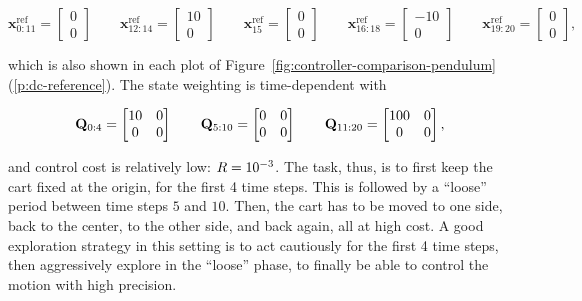 \begin{fullwidth}\vspace{-\baselineskip}
\begin{equation}
  \label{eq:exp2-trajectory}
  \mathbf{x}^\text{ref}_{0:11} = \begin{bmatrix} 0 \\ 0 \end{bmatrix}
  \qquad
  \mathbf{x}^\text{ref}_{12:14} = \begin{bmatrix} 10 \\ 0 \end{bmatrix}
  \qquad
  \mathbf{x}^\text{ref}_{15} = \begin{bmatrix} 0 \\ 0 \end{bmatrix}
  \qquad
  \mathbf{x}^\text{ref}_{16:18} = \begin{bmatrix} -10 \\ 0 \end{bmatrix}
  \qquad
  \mathbf{x}^\text{ref}_{19:20} = \begin{bmatrix} 0 \\ 0 \end{bmatrix},
\end{equation}
\end{fullwidth}
which is also shown in each plot of
Figure~\ref{fig:controller-comparison-pendulum}
(\ref*{p:dc-reference}). The state weighting is time-dependent with
\begin{fullwidth}\vspace{-\baselineskip}
\begin{equation}
  \mathbf{Q}_{0:4} = \begin{bmatrix} 10 & 0 \\ 0 & 0 \end{bmatrix}
  \qquad
  \mathbf{Q}_{5:10} = \begin{bmatrix} 0 & 0 \\ 0 & 0 \end{bmatrix}
  \qquad
  \mathbf{Q}_{11:20} = \begin{bmatrix} 100 & 0 \\ 0 & 0 \end{bmatrix},
\end{equation}
\end{fullwidth}
and control cost is relatively low: $R = 10^{-3}$. The task, thus, is to first
keep the cart fixed at the origin, for the first 4 time steps. This is followed
by a ``loose'' period between time steps $5$ and $10$. Then, the cart has to be
moved to one side, back to the center, to the other side, and back again, all at
high cost. A good exploration strategy in this setting is to act cautiously for
the first 4 time steps, then aggressively explore in the ``loose'' phase, to
finally be able to control the motion with high precision.


